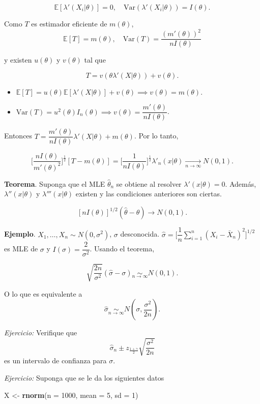 \documentclass[
  12pt,
]{book}
\newenvironment{Shaded}{\begin{snugshade}}{\end{snugshade}}
\newcommand{\DataTypeTok}[1]{\textcolor[rgb]{0.13,0.29,0.53}{#1}}
\newcommand{\DecValTok}[1]{\textcolor[rgb]{0.00,0.00,0.81}{#1}}
\newcommand{\KeywordTok}[1]{\textcolor[rgb]{0.13,0.29,0.53}{\textbf{#1}}}
\newcommand{\NormalTok}[1]{#1}
\newcommand{\StringTok}[1]{\textcolor[rgb]{0.31,0.60,0.02}{#1}}
\begin{document}
\[\mathbb E[\lambda'(X_i|\theta)] = 0, \quad \text{Var}(\lambda'(X_i|\theta)) = I(\theta).\]

Como \(T\) es estimador eficiente de \(m(\theta)\),
\[\mathbb E[T] = m(\theta), \quad \text{Var}(T) = \dfrac{(m'(\theta))^2}{nI(\theta)}\]

y existen \(u(\theta)\) y \(v(\theta)\) tal que

\[T = v(\theta \lambda'(X|\theta)) + v(\theta).\]

\begin{itemize}
\item
  \(\mathbb E [T]= u(\theta)\mathbb E[\lambda'(X|\theta)] + v(\theta) \implies v(\theta) = m(\theta)\).
\item
  \(\text{Var}(T) = u^2(\theta)I_n(\theta) \implies v(\theta) = \dfrac{m'(\theta)}{nI(\theta)}\).
\end{itemize}

Entonces \(T = \dfrac{m'(\theta)}{nI(\theta)}\lambda'(X|\theta) + m(\theta)\). Por lo tanto,

\[\bigg[\dfrac{nI(\theta)}{m'(\theta)^2}\bigg]^{\frac 12}[T-m(\theta)] = \bigg[\dfrac 1 {nI(\theta)}\bigg]^{\frac 12}\lambda'_n(x|\theta) \xrightarrow[n\to\infty]{} N(0,1).\]

\textbf{Teorema}. Suponga que el MLE \(\hat \theta_n\) se obtiene al resolver \(\lambda'(x|\theta) = 0\). Además, \(\lambda''(x|\theta)\) y \(\lambda'''(x|\theta)\) existen y las condiciones anteriores son ciertas.

\[[nI(\theta)]^{1/2}(\hat\theta-\theta) \to N(0,1).\]

\textbf{Ejemplo}. \(X_1,\dots, X_n \sim N(0,\sigma^2)\), \(\sigma\) desconocida. \(\hat\sigma = \bigg[\dfrac 1n \sum_{i=1}^{n}\left(X_{i}-\bar{X}_{n}\right)^{2}\bigg]^{1/2}\) es MLE de \(\sigma\) y \(I(\sigma) = \dfrac 2{\sigma^2}\).
Usando el teorema,

\[\sqrt{\dfrac{2n}{\sigma^2}} (\hat{\sigma} - \sigma) \underset{n\to\infty}{\sim} N\left(0,1\right).\]

O lo que es equivalente a \[\hat{\sigma} \underset{n\to\infty}{\sim}
N\left(\sigma,\dfrac{\sigma^2}{2n}\right).\]

\emph{Ejercicio:} Verifique que
\[ \hat\sigma_n\pm z_{\frac{1+\gamma}{2}}\sqrt{\dfrac{\sigma^2}{2n}}\] es un
intervalo de confianza para \(\sigma\).

\emph{Ejercicio:} Suponga que se le da los siguientes datos

\begin{Shaded}
\begin{Highlighting}[]
\NormalTok{X \textless{}{-}}\StringTok{ }\KeywordTok{rnorm}\NormalTok{(}\DataTypeTok{n =} \DecValTok{1000}\NormalTok{, }\DataTypeTok{mean =} \DecValTok{5}\NormalTok{, }\DataTypeTok{sd =} \DecValTok{1}\NormalTok{)}
\end{Highlighting}
\end{Shaded}
\end{document}
